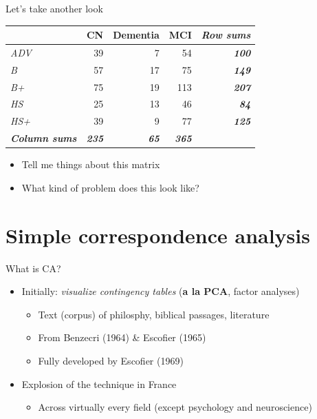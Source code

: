 \documentclass[
  ignorenonframetext,
]{beamer}
\providecommand{\tightlist}{%
  \setlength{\itemsep}{0pt}\setlength{\parskip}{0pt}}
\begin{document}
\begin{frame}{Let's take another look}
\protect\hypertarget{lets-take-another-look}{}

\begin{table}[H]
\centering
\begin{tabular}{>{\em}lrrr>{\bfseries\em}r}
\toprule
  & CN & Dementia & MCI & Row sums\\
\midrule
ADV & 39 & 7 & 54 & 100\\
B & 57 & 17 & 75 & 149\\
B+ & 75 & 19 & 113 & 207\\
HS & 25 & 13 & 46 & 84\\
HS+ & 39 & 9 & 77 & 125\\
\addlinespace
\em{\textbf{Column sums}} & \em{\textbf{235}} & \em{\textbf{65}} & \em{\textbf{365}}\\
\bottomrule
\end{tabular}
\end{table}

\begin{itemize}[<+->]
\tightlist
\item
  Tell me things about this matrix
\item
  What kind of problem does this look like?
\end{itemize}

\end{frame}

\hypertarget{simple-correspondence-analysis}{%
\section{Simple correspondence
analysis}\label{simple-correspondence-analysis}}

\begin{frame}{What is CA?}
\protect\hypertarget{what-is-ca}{}

\begin{itemize}[<+->]
\tightlist
\item
  Initially: \emph{visualize contingency tables} (\textbf{a la PCA},
  factor analyses)

  \begin{itemize}[<+->]
  \tightlist
  \item
    Text (corpus) of philosphy, biblical passages, literature
  \item
    From Benzecri (1964) \& Escofier (1965)
  \item
    Fully developed by Escofier (1969)
  \end{itemize}
\item
  Explosion of the technique in France

  \begin{itemize}[<+->]
  \tightlist
  \item
    Across virtually every field (except psychology and neuroscience)
  \end{itemize}
\end{itemize}

\end{frame}
\end{document}
